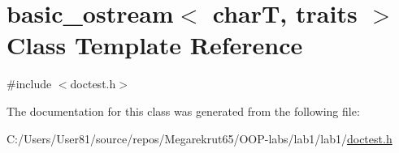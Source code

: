 \hypertarget{classbasic__ostream}{}\section{basic\+\_\+ostream$<$ charT, traits $>$ Class Template Reference}
\label{classbasic__ostream}


{\ttfamily \#include $<$doctest.\+h$>$}



The documentation for this class was generated from the following file\+:\begin{DoxyCompactItemize}
\item 
C\+:/\+Users/\+User81/source/repos/\+Megarekrut65/\+O\+O\+P-\/labs/lab1/lab1/\mbox{\hyperlink{doctest_8h}{doctest.\+h}}\end{DoxyCompactItemize}
